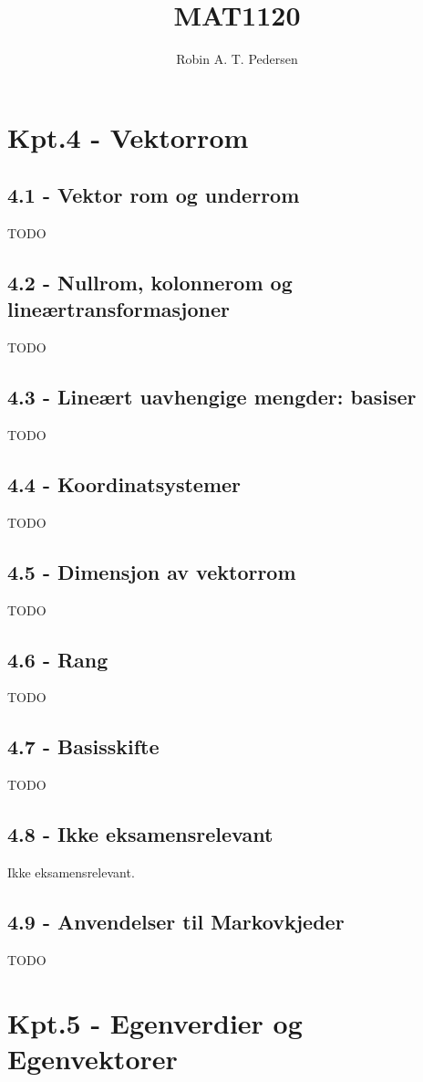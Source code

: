 \documentclass{article}
\begin{document}
  \title{MAT1120}
  \author{Robin A. T. Pedersen}
  \maketitle
  \tableofcontents

  \section{Kpt.4 - Vektorrom}
    \subsection{4.1 - Vektor rom og underrom}
      TODO
    \subsection{4.2 - Nullrom, kolonnerom og lineærtransformasjoner}
      TODO
    \subsection{4.3 - Lineært uavhengige mengder: basiser}
      TODO
    \subsection{4.4 - Koordinatsystemer}
      TODO
    \subsection{4.5 - Dimensjon av vektorrom}
      TODO
    \subsection{4.6 - Rang}
      TODO
    \subsection{4.7 - Basisskifte}
      TODO
    \subsection{4.8 - Ikke eksamensrelevant}
      Ikke eksamensrelevant.
    \subsection{4.9 - Anvendelser til Markovkjeder}
      TODO
  \section{Kpt.5 - Egenverdier og Egenvektorer}
\end{document}
